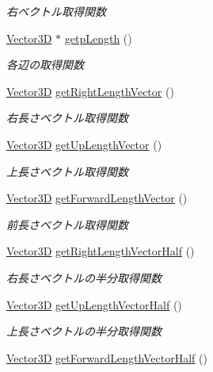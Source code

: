 \begin{DoxyCompactItemize}
\begin{DoxyCompactList}\small\item\em 右ベクトル取得関数 \end{DoxyCompactList}\item 
\mbox{\hyperlink{class_vector3_d}{Vector3D}} $\ast$ \mbox{\hyperlink{class_o_b_b_a831280fe9affdea9bd5c4c6f28d4a9cc}{getp\+Length}} ()
\begin{DoxyCompactList}\small\item\em 各辺の取得関数 \end{DoxyCompactList}\item 
\mbox{\hyperlink{class_vector3_d}{Vector3D}} \mbox{\hyperlink{class_o_b_b_ac2cdb5afcc71053f5e6275bac95920bc}{get\+Right\+Length\+Vector}} ()
\begin{DoxyCompactList}\small\item\em 右長さベクトル取得関数 \end{DoxyCompactList}\item 
\mbox{\hyperlink{class_vector3_d}{Vector3D}} \mbox{\hyperlink{class_o_b_b_a9c08e8f3b799170efd244b4e700482c2}{get\+Up\+Length\+Vector}} ()
\begin{DoxyCompactList}\small\item\em 上長さベクトル取得関数 \end{DoxyCompactList}\item 
\mbox{\hyperlink{class_vector3_d}{Vector3D}} \mbox{\hyperlink{class_o_b_b_a94b2f93f025e4684c414c7fa1d0447ee}{get\+Forward\+Length\+Vector}} ()
\begin{DoxyCompactList}\small\item\em 前長さベクトル取得関数 \end{DoxyCompactList}\item 
\mbox{\hyperlink{class_vector3_d}{Vector3D}} \mbox{\hyperlink{class_o_b_b_a9603eb8bafea12e725a99e1a0c5b8464}{get\+Right\+Length\+Vector\+Half}} ()
\begin{DoxyCompactList}\small\item\em 右長さベクトルの半分取得関数 \end{DoxyCompactList}\item 
\mbox{\hyperlink{class_vector3_d}{Vector3D}} \mbox{\hyperlink{class_o_b_b_a570ab6551e9995c67db27fe85b081611}{get\+Up\+Length\+Vector\+Half}} ()
\begin{DoxyCompactList}\small\item\em 上長さベクトルの半分取得関数 \end{DoxyCompactList}\item 
\mbox{\hyperlink{class_vector3_d}{Vector3D}} \mbox{\hyperlink{class_o_b_b_a08f76bee35b5b5bac44432ccc9571b33}{get\+Forward\+Length\+Vector\+Half}} ()

\end{DoxyCompactItemize}
